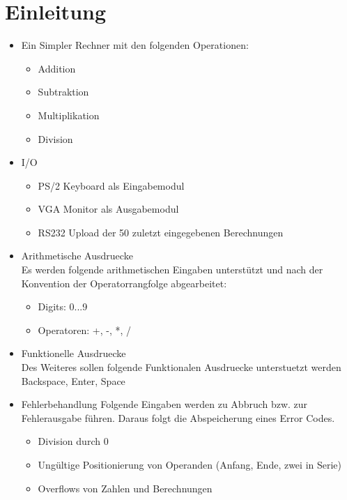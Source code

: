 \section{Einleitung}
\begin{itemize}
 \item Ein Simpler Rechner mit den folgenden Operationen:
	\begin{itemize}
	 \item Addition
	 \item Subtraktion
	 \item Multiplikation
	 \item Division
	\end{itemize}
 \item I/O
 	\begin{itemize}
 	 \item PS/2 Keyboard als Eingabemodul
 	 \item VGA Monitor als Ausgabemodul
 	 \item RS232 Upload der 50 zuletzt eingegebenen Berechnungen
 	\end{itemize}
 \item Arithmetische Ausdruecke\\
	Es werden folgende arithmetischen Eingaben unterstützt und nach der Konvention
		der Operatorrangfolge abgearbeitet:
 	\begin{itemize}
 	 \item Digits:     0...9
 	 \item Operatoren: +, -, *, /
 	\end{itemize}
 \item Funktionelle Ausdruecke\\
 	Des Weiteres sollen folgende Funktionalen Ausdruecke unterstuetzt werden\\
 	 Backspace, Enter, Space
 \item Fehlerbehandlung
	Folgende Eingaben werden zu Abbruch bzw. zur Fehlerausgabe führen. Daraus folgt die Abspeicherung 
		eines Error Codes.
	\begin{itemize}
 	 \item Division durch 0
	 \item Ungültige Positionierung von Operanden (Anfang, Ende, zwei in Serie)
	 \item Overflows von Zahlen und Berechnungen
	\end{itemize}

\end{itemize}